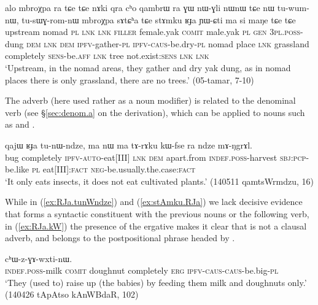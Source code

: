 \begin{exe}
\ex \label{ex:stAmku.RJa}
\gll alo mbroχpa ra tɕe tɕe nɤki qra cʰo qambrɯ ra ɣɯ nɯ-ɣli nɯnɯ tɕe nɯ tu-wum-nɯ, tu-sɯɣ-rom-nɯ mbroχpa sɤtɕʰa tɕe stɤmku ʁɟa ɲɯ-ɕti ma si maŋe tɕe tɕe    \\
upstream nomad \textsc{pl} \textsc{lnk} \textsc{lnk} \textsc{filler} female.yak \textsc{comit} male.yak \textsc{pl} \textsc{gen} \textsc{3pl}.\textsc{poss}-dung \textsc{dem} \textsc{lnk} \textsc{dem} \textsc{ipfv}-gather-\textsc{pl} \textsc{ipfv}-\textsc{caus}-be.dry-\textsc{pl} nomad place \textsc{lnk} grassland completely \textsc{sens}-be.\textsc{aff} \textsc{lnk} tree not.exist:\textsc{sens} \textsc{lnk} \textsc{lnk}  \\
\glt `Upstream, in the nomad areas, they gather and dry yak dung, as in nomad places there is only grassland, there are no trees.' (05-tamar, 7-10)
\end{exe}

The adverb  (here used rather as a noun modifier) is related to the denominal verb  (see §\ref{sec:denom.a} on the  derivation), which can be applied to nouns such as  and .
 
\begin{exe}
\ex \label{ex:RJa.tunWndze}
 \gll qajɯ ʁɟa tu-nɯ-ndze, ma nɯ ma tɤ-rɤku kɯ-fse ra ndze mɤ-ŋgrɤl. \\
 bug completely \textsc{ipfv}-\textsc{auto}-eat[III] \textsc{lnk} \textsc{dem} apart.from \textsc{indef}.\textsc{poss}-harvest \textsc{sbj}:\textsc{pcp}-be.like \textsc{pl} eat[III]:\textsc{fact} \textsc{neg}-be.usually.the.case:\textsc{fact} \\ 
\glt `It only eats insects, it does not eat cultivated plants.' (140511 qamtsWrmdzu, 16)
\end{exe}

While in (\ref{ex:RJa.tunWndze})  and (\ref{ex:stAmku.RJa}) we lack decisive evidence that  forms a syntactic constituent with the previous nouns or the following verb, in (\ref{ex:RJa.kW}) the presence of the ergative makes it clear that  is not a clausal adverb, and belongs to the postpositional phrase headed by .

\begin{exe}
\ex \label{ex:RJa.kW}
  cʰɯ-z-ɣɤ-wxti-nɯ. \\
 \textsc{indef}.\textsc{poss}-milk \textsc{comit} doughnut completely \textsc{erg} \textsc{ipfv}-\textsc{caus}-\textsc{caus}-be.big-\textsc{pl} \\
\glt `They (used to) raise up (the babies) by feeding them milk and doughnuts only.' (140426 tApAtso kAnWBdaR, 102)
\end{exe}

